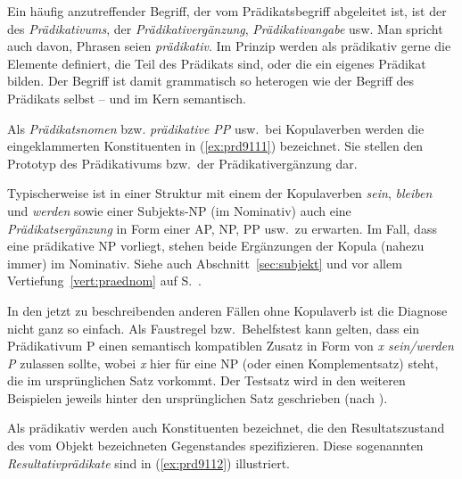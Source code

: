 Ein häufig anzutreffender Begriff, der vom Prädikatsbegriff abgeleitet ist, ist der des \textit{Prädikativums}, der \textit{Prädikativergänzung}, \textit{Prädikativangabe} usw.
Man spricht auch davon, Phrasen seien \textit{prädikativ}.
Im Prinzip werden als prädikativ gerne die Elemente definiert, die Teil des Prädikats sind, oder die ein eigenes Prädikat bilden.
Der Begriff ist damit grammatisch so heterogen wie der Begriff des Prädikats selbst -- und im Kern semantisch.


Als \textit{Prädikatsnomen} bzw. \textit{prädikative PP} usw.\ bei Kopulaverben werden die eingeklammerten Konstituenten in (\ref{ex:prd9111}) bezeichnet.
Sie stellen den Prototyp des Prädikativums bzw.\ der Prädikativergänzung dar.


\begin{exe}
  \ex\label{ex:prd9111} 
  \begin{xlist}
  \end{xlist}
\end{exe}

Typischerweise ist in einer Struktur mit einem der Kopulaverben \textit{sein}, \textit{bleiben} und \textit{werden} sowie einer Subjekts-NP (im Nominativ) auch eine \textit{Prädikatsergänzung} in Form einer AP, NP, PP usw.\ zu erwarten.
Im Fall, dass eine prädikative NP vorliegt, stehen beide Ergänzungen der Kopula (nahezu immer) im Nominativ.
Siehe auch Abschnitt~\ref{sec:subjekt} und vor allem Vertiefung~\ref{vert:praednom} auf S.~\pageref{vert:praednom}.

In den jetzt zu beschreibenden anderen Fällen ohne Kopulaverb ist die Diagnose nicht ganz so einfach.
Als Faustregel bzw.\ Behelfstest kann gelten, dass ein Prädikativum P einen semantisch kompatiblen Zusatz in Form von \textit{x sein/werden P} zulassen sollte, wobei \textit{x} hier für eine NP (oder einen Komplementsatz) steht, die im ursprünglichen Satz vorkommt.
Der Testsatz wird in den weiteren Beispielen jeweils hinter den ursprünglichen Satz geschrieben (nach \Folgt).

Als prädikativ werden auch Konstituenten bezeichnet, die den Resultatszustand des vom Objekt bezeichneten Gegenstandes spezifizieren.
Diese sogenannten \textit{Resultativprädikate} sind in (\ref{ex:prd9112}) illustriert.

